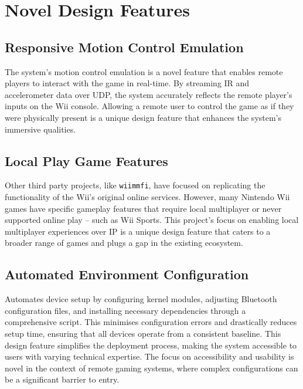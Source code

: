 \section{Novel Design Features}

\subsection{Responsive Motion Control Emulation}
The system’s motion control emulation is a novel feature that enables remote players to interact with the game in real-time. By streaming IR and accelerometer data over UDP, the system accurately reflects the remote player’s inputs on the Wii console. Allowing a remote user to control the game as if they were physically present is a unique design feature that enhances the system’s immersive qualities.

\subsection{Local Play Game Features}
Other third party projects, like \texttt{wiimmfi}\cite{wiimmfi}, have focused on replicating the functionality of the Wii’s original online services. However, many Nintendo Wii games have specific gameplay features that require local multiplayer or never supported online play -- such as Wii Sports. This project’s focus on enabling local multiplayer experiences over IP is a unique design feature that caters to a broader range of games and plugs a gap in the existing ecosystem.

\subsection{Automated Environment Configuration}
Automates device setup by configuring kernel modules, adjusting Bluetooth configuration files, and installing necessary dependencies through a comprehensive script. This minimises configuration errors and drastically reduces setup time, ensuring that all devices operate from a consistent baseline. This design feature simplifies the deployment process, making the system accessible to users with varying technical expertise. The focus on accessibility and usability is novel in the context of remote gaming systems, where complex configurations can be a significant barrier to entry\cite{dirkBarrierToEntry}.


